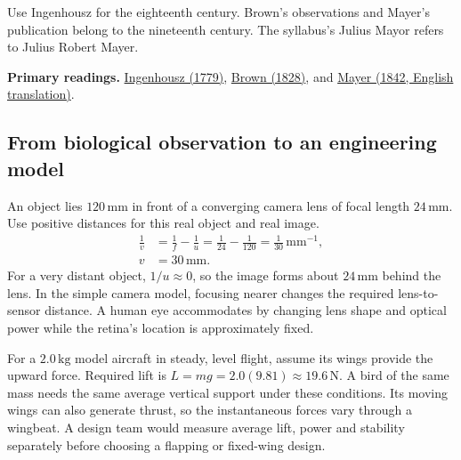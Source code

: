 \documentclass[12pt,a4paper]{article}
\begin{document}
\begin{tcolorbox}[masonbox, title={Exam chronology}]
Use Ingenhousz for the eighteenth century. Brown's observations and Mayer's publication belong to the nineteenth century. The syllabus's Julius Mayor refers to Julius Robert Mayer.
\end{tcolorbox}

\textbf{Primary readings.} \href{https://www.biodiversitylibrary.org/item/127139}{Ingenhousz (1779)}, \href{https://www.rpgroup.caltech.edu/marseillePBoC2024/assets/pdfs/Brown1828.pdf}{Brown (1828)}, and \href{https://web.lemoyne.edu/Giunta/mayer.html}{Mayer (1842, English translation)}.

\subsection{From biological observation to an engineering model}
\begin{tcolorbox}[examplebox, title={Work the eye--camera analogy with a thin lens}]
An object lies $120\,\mathrm{mm}$ in front of a converging camera lens of focal length $24\,\mathrm{mm}$. Use positive distances for this real object and real image.
\[
\begin{aligned}
\frac1v&=\frac1f-\frac1u
=\frac1{24}-\frac1{120}
=\frac1{30}\,\mathrm{mm}^{-1},\\
v&=30\,\mathrm{mm}.
\end{aligned}
\]
For a very distant object, $1/u\approx0$, so the image forms about $24\,\mathrm{mm}$ behind the lens. In the simple camera model, focusing nearer changes the required lens-to-sensor distance. A human eye accommodates by changing lens shape and optical power while the retina's location is approximately fixed.
\end{tcolorbox}

\begin{tcolorbox}[examplebox, title={Turn the flight comparison into a design problem}]
For a $2.0\,\mathrm{kg}$ model aircraft in steady, level flight, assume its wings provide the upward force. Required lift is $L=mg=2.0(9.81)\approx19.6\,\mathrm N$. A bird of the same mass needs the same average vertical support under these conditions. Its moving wings can also generate thrust, so the instantaneous forces vary through a wingbeat. A design team would measure average lift, power and stability separately before choosing a flapping or fixed-wing design.
\end{tcolorbox}
\end{document}
